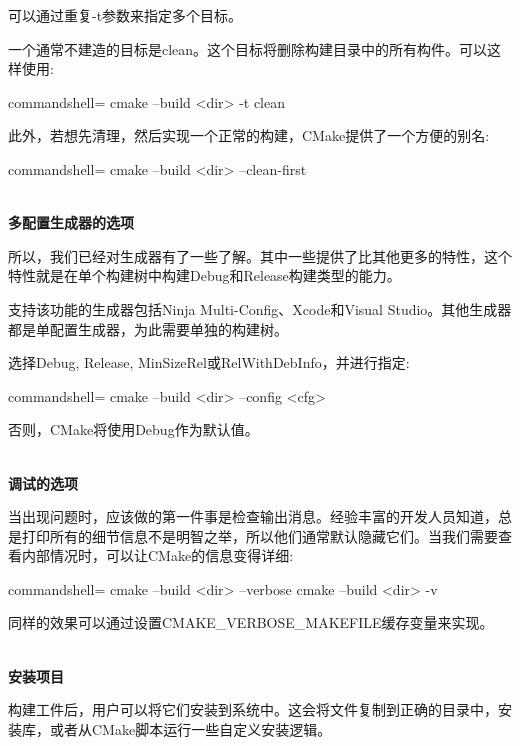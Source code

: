 可以通过重复-t参数来指定多个目标。

一个通常不建造的目标是clean。这个目标将删除构建目录中的所有构件。可以这样使用:

\begin{tcblisting}{commandshell={}}
cmake --build <dir> -t clean
\end{tcblisting}

此外，若想先清理，然后实现一个正常的构建，CMake提供了一个方便的别名:

\begin{tcblisting}{commandshell={}}
cmake --build <dir> --clean-first
\end{tcblisting}

\hspace*{\fill} \\ %
\noindent
\textbf{多配置生成器的选项}

所以，我们已经对生成器有了一些了解。其中一些提供了比其他更多的特性，这个特性就是在单个构建树中构建Debug和Release构建类型的能力。

支持该功能的生成器包括Ninja Multi-Config、Xcode和Visual Studio。其他生成器都是单配置生成器，为此需要单独的构建树。

选择Debug, Release, MinSizeRel或RelWithDebInfo，并进行指定:

\begin{tcblisting}{commandshell={}}
cmake --build <dir> --config <cfg>
\end{tcblisting}

否则，CMake将使用Debug作为默认值。

\hspace*{\fill} \\ %
\noindent
\textbf{调试的选项}

当出现问题时，应该做的第一件事是检查输出消息。经验丰富的开发人员知道，总是打印所有的细节信息不是明智之举，所以他们通常默认隐藏它们。当我们需要查看内部情况时，可以让CMake的信息变得详细:

\begin{tcblisting}{commandshell={}}
cmake --build <dir> --verbose
cmake --build <dir> -v
\end{tcblisting}

同样的效果可以通过设置CMAKE\_VERBOSE\_MAKEFILE缓存变量来实现。

\hspace*{\fill} \\ %
\noindent
\textbf{安装项目}

构建工件后，用户可以将它们安装到系统中。这会将文件复制到正确的目录中，安装库，或者从CMake脚本运行一些自定义安装逻辑。

